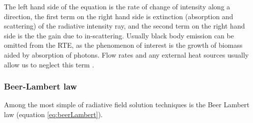 The left hand side of the equation is the rate of change of intensity along a direction, the first term on the right hand side is extinction (absorption and scattering) of the radiative intensity ray, and the second term on the right hand side is the the gain due to in-scattering. Usually black body emission can be omitted from the RTE, as the phenomenon of interest is the growth of biomass aided by absorption of photons. Flow rates and any external heat sources usually allow us to neglect this term \cite{lee1994}.


\subsubsection{Beer-Lambert law}
\label{S:2.3.1}
Among the most simple of radiative field solution techniques is the Beer Lambert law (equation \ref{eq:beerLambert}). 


